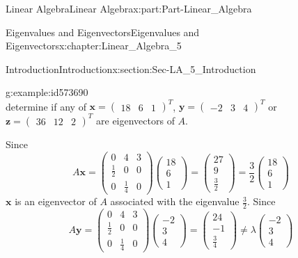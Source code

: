 \documentclass[oneside,10pt,]{book}
\numberwithin{equation}{section}
\newcommand{\amp}{&}
\begin{document}
\begin{partptx}{Linear Algebra}{}{Linear Algebra}{}{}{x:part:Part-Linear_Algebra}
\begin{chapterptx}{Eigenvalues and Eigenvectors}{}{Eigenvalues and Eigenvectors}{}{}{x:chapter:Linear_Algebra_5}
\begin{sectionptx}{Introduction}{}{Introduction}{}{}{x:section:Sec-LA_5_Introduction}
\begin{example}{}{g:example:id573690}
\begin{equation*}
\end{equation*}
determine if any of \(\mathbf{x}=\begin{pmatrix} 18 \amp 6 \amp 1 \end{pmatrix}^T \), \(\mathbf{y}=\begin{pmatrix} -2 \amp 3 \amp 4 \end{pmatrix}^T \) or \(\mathbf{z}=\begin{pmatrix} 36 \amp 12 \amp 2 \end{pmatrix}^T \) are eigenvectors of \(A\).%
\par\smallskip%
\noindent\hypertarget{g:solution:id573744}{}Since%
\begin{equation*}
A\mathbf{x}=\begin{pmatrix} 0 \amp 4 \amp 3 \\ \frac{1}{2} \amp 0 \amp 0 \\ 0 \amp \frac{1}{4} \amp 0 \end{pmatrix} \begin{pmatrix} 18 \\ 6 \\ 1 \end{pmatrix} = \begin{pmatrix} 27 \\ 9 \\ \frac{3}{2} \end{pmatrix} = \frac{3}{2}\begin{pmatrix} 18 \\ 6 \\ 1 \end{pmatrix} 
\end{equation*}
\(\mathbf{x}\) is an eigenvector of \(A\) associated with the eigenvalue \(\frac{3}{2}\). Since%
\begin{equation*}
A\mathbf{y}=\begin{pmatrix} 0 \amp 4 \amp 3 \\ \frac{1}{2} \amp 0 \amp 0 \\ 0 \amp \frac{1}{4} \amp 0 \end{pmatrix} \begin{pmatrix} -2 \\ 3 \\ 4 \end{pmatrix} = \begin{pmatrix} 24 \\ -1 \\ \frac{3}{4} \end{pmatrix} \neq \lambda\begin{pmatrix} -2 \\ 3 \\ 4 \end{pmatrix} 

\end{equation*}
\end{example}
\end{sectionptx}
\end{chapterptx}
\end{partptx}
\end{document}
